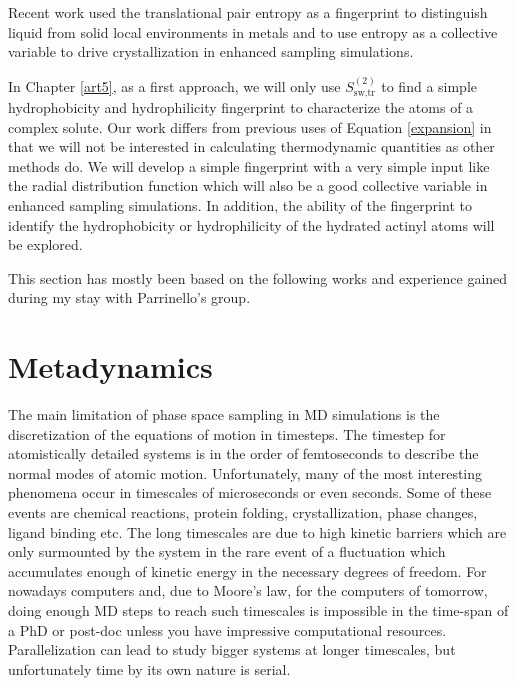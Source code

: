 Recent work used the translational pair entropy as a 
fingerprint to distinguish liquid from solid local environments in metals\cite{Piaggi2017b}  and to 
use entropy as a collective variable to drive crystallization in enhanced sampling 
simulations\cite{Piaggi2017}. 

In Chapter \ref{art5}, as a first approach, we will only use $S^{\left(2\right)}_\text{sw,tr}$ 
to 
find a simple hydrophobicity and 
hydrophilicity fingerprint to characterize the atoms of a complex solute. Our work differs from 
previous uses of Equation \ref{expansion} in that we will not be interested in calculating 
thermodynamic quantities as other methods do. We will develop a simple fingerprint with a 
very simple input like the radial distribution function which will also be a good collective 
variable in enhanced sampling simulations. In addition, the ability of the fingerprint to identify 
the hydrophobicity or hydrophilicity of the hydrated actinyl atoms will be explored. 

This section has mostly been based on the following 
works\cite{lazaridis1992entropy,lazaridis1994simulation,bergman1999topological,
lazaridis2000solvent,
kinoshita2006pair,liu2015order,Lazaridis1996,zielkiewicz2008two,Giuffre2010,Agarwal2011,
Zhang2011,lazaridis1998inhomogeneous} and experience gained during my stay with
Parrinello's
group.

\section{Metadynamics}\label{sec:metadynamics}
The main limitation of phase space sampling in MD simulations is the discretization 
of the equations of motion in timesteps. The timestep for atomistically detailed 
systems is in the order of femtoseconds to describe the normal modes of atomic motion. 
Unfortunately, many of the most interesting phenomena occur in timescales of microseconds or even 
seconds. Some of these events are chemical reactions, protein folding, crystallization, phase 
changes, ligand binding etc. The long timescales are due to high kinetic barriers which 
are only surmounted by the system in the rare event of a fluctuation which accumulates enough of 
kinetic energy in the necessary degrees of freedom. For nowadays computers and, due to Moore's 
law, for the computers of tomorrow, doing enough MD steps to reach such timescales is 
impossible in the time-span of a PhD or post-doc unless you have impressive computational 
resources. 
Parallelization can lead to study bigger systems at longer timescales, 
but unfortunately time by its own nature is serial.


